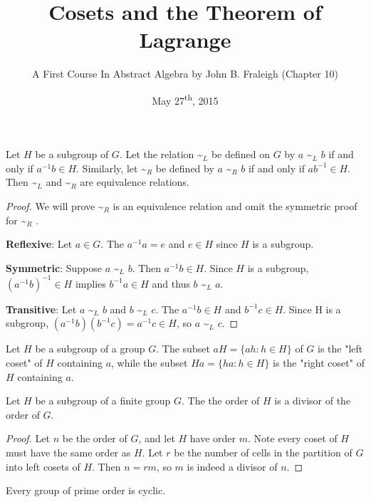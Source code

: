 \documentclass[a4paper,11pt]{article}
\title{Cosets and the Theorem of Lagrange}
\author{A First Course In Abstract Algebra by John B. Fraleigh (Chapter 10)}
\date{May 27\textsuperscript{th}, 2015}
\newcommand{\lowtilde}[1] {
  \textasciitilde{}\(_{#1}\)
}
\begin{document}
\maketitle
{}

\begin{outline}

    Let \(H\) be a subgroup of \(G\). Let the relation\lowtilde{L}be defined on \(G\) 
    by \(a\)\lowtilde{L}\(b\) if and only if \(a^{-1}b \in H\). Similarly, let\lowtilde{R}be defined 
    by \(a\)\lowtilde{R}\(b\) if and only if \(ab^{-1} \in H\). Then\lowtilde{L}and\lowtilde{R}are 
    equivalence relations.
    
    \begin{proof}
      We will prove\lowtilde{R}is an equivalence relation and omit the symmetric proof for\lowtilde{R}.
      
      \textbf{Reflexive}: Let \(a \in G\). The \(a^{-1}a = e\) and \(e \in H\) since \(H\) is a subgroup.
      
      \textbf{Symmetric}: Suppose \(a\)\lowtilde{L}\(b\). Then \(a^{-1}b \in H\). Since \(H\) is a subgroup,
      \((a^{-1}b)^{-1} \in H\) implies \(b^{-1}a \in H\) and thus \(b\)\lowtilde{L}\(a\).
      
      \textbf{Transitive}: Let \(a\)\lowtilde{L}\(b\) and \(b\)\lowtilde{L}\(c\). The \(a^{-1}b \in H\) 
      and \(b^{-1}c \in H\). Since H is a subgroup, \((a^{-1}b)(b^{-1}c) = a^{-1}c \in H\), so 
      \(a\)\lowtilde{L}\(c\).
    \end{proof}
    
    Let \(H\) be a subgroup of a group \(G\). The subset \(aH = \{ah : h \in H\}\) of \(G\)
    is the "left coset" of \(H\) containing \(a\), while the subset \(Ha = \{ha : h \in H\}\) is the "right
    coset" of \(H\) containing \(a\).
    
    Let \(H\) be a subgroup of a finite group \(G\). The the order of \(H\) is a divisor of the order of \(G\).
    
    \begin{proof}
      Let \(n\) be the order of \(G\), and let \(H\) have order \(m\). Note every coset of \(H\) must have
      the same order as \(H\). Let \(r\) be the number of cells in the partition of \(G\) into left cosets of
      \(H\). Then \(n = rm\), so \(m\) is indeed a divisor of \(n\).
    \end{proof}
    
    Every group of prime order is cyclic.
    

\end{outline}
\end{document}
